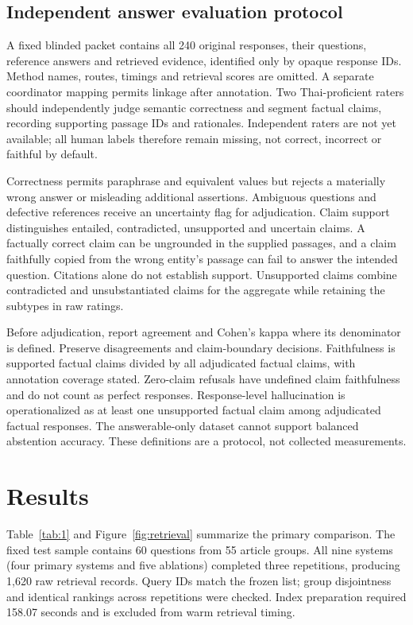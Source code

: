 \documentclass[10pt,a4paper]{article}
\begin{document}
\hypertarget{independent-answer-evaluation-protocol}{%
\subsection{Independent answer evaluation
protocol}\label{independent-answer-evaluation-protocol}}

A fixed blinded packet contains all 240 original responses, their
questions, reference answers and retrieved evidence, identified only by
opaque response IDs. Method names, routes, timings and retrieval scores
are omitted. A separate coordinator mapping permits linkage after
annotation. Two Thai-proficient raters should independently judge
semantic correctness and segment factual claims, recording supporting
passage IDs and rationales. Independent raters are not yet available;
all human labels therefore remain missing, not correct, incorrect or
faithful by default.

Correctness permits paraphrase and equivalent values but rejects a
materially wrong answer or misleading additional assertions. Ambiguous
questions and defective references receive an uncertainty flag for
adjudication. Claim support distinguishes entailed, contradicted,
unsupported and uncertain claims. A factually correct claim can be
ungrounded in the supplied passages, and a claim faithfully copied from
the wrong entity's passage can fail to answer the intended question.
Citations alone do not establish support. Unsupported claims combine
contradicted and unsubstantiated claims for the aggregate while
retaining the subtypes in raw ratings.

Before adjudication, report agreement and Cohen's kappa where its
denominator is defined. Preserve disagreements and claim-boundary
decisions. Faithfulness is supported factual claims divided by all
adjudicated factual claims, with annotation coverage stated. Zero-claim
refusals have undefined claim faithfulness and do not count as perfect
responses. Response-level hallucination is operationalized as at least
one unsupported factual claim among adjudicated factual responses. The
answerable-only dataset cannot support balanced abstention accuracy.
These definitions are a protocol, not collected measurements.

\hypertarget{results}{%
\section{Results}\label{results}}

Table~\ref{tab:1} and Figure~\ref{fig:retrieval} summarize the primary comparison. The fixed test sample contains 60 questions from 55 article groups. All
nine systems (four primary systems and five ablations) completed three
repetitions, producing 1,620 raw retrieval records. Query IDs match the
frozen list; group disjointness and identical rankings across
repetitions were checked. Index preparation required 158.07 seconds and
is excluded from warm retrieval timing.
\end{document}
